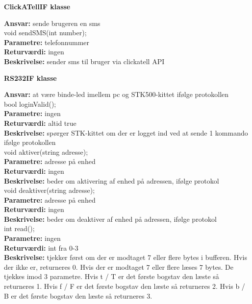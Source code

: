 \newpage

{\centering 
\textbf{ClickATellIF klasse}\par
}
\textbf{Ansvar:} sende brugeren en sms \\

void sendSMS(int number); \\
\textbf{Parametre:} telefonnummer \\
\textbf{Returværdi:} ingen \\
\textbf{Beskrivelse:} sender sms til bruger via clickatell API \\

{\centering 
\textbf{RS232IF klasse}\par
}
\textbf{Ansvar:} at være binde-led imellem pc og STK500-kittet ifølge protokollen \\

bool loginValid(); \\
\textbf{Parametre:} ingen \\
\textbf{Returværdi:} altid true\\
\textbf{Beskrivelse:} spørger STK-kittet om der er logget ind ved at sende 1 kommando ifølge protokollen \\

void aktiver(string adresse); \\
\textbf{Parametre:} adresse på enhed \\
\textbf{Returværdi:} ingen \\
\textbf{Beskrivelse:} beder om aktivering af enhed på adressen, ifølge protokol \\

void deaktiver(string adresse); \\
\textbf{Parametre:} adresse på enhed \\
\textbf{Returværdi:} ingen \\
\textbf{Beskrivelse:} beder om deaktiver af enhed på adressen, ifølge protokol \\

int read(); \\
\textbf{Parametre:} ingen\\
\textbf{Returværdi:} int fra 0-3 \\
\textbf{Beskrivelse:} tjekker først om der er modtaget 7 eller flere bytes i bufferen. Hvis der ikke er, returneres 0. Hvis der er modtaget 7 eller flere læses 7 bytes. De tjekkes imod 3 parametre. Hvis t / T er det første bogstav den læste så returneres 1. Hvis f / F er det første bogstav den læste så returneres 2. Hvis b / B er det første bogstav den læste så returneres 3.  

